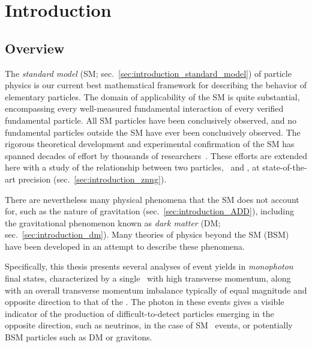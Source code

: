 \chapter{Introduction} \label{chap:introduction}
\section{Overview} \label{sec:introduction_overview}
The \textit{standard model} (SM; sec.~\ref{sec:introduction_standard_model}) of particle physics is our current best mathematical framework for describing the behavior
of elementary particles. The domain of applicability of the SM is quite substantial, encompassing
every well-measured fundamental interaction of every verified fundamental particle. All SM particles have been conclusively observed,
and no fundamental particles outside the SM have ever been conclusively observed. The rigorous theoretical development and experimental confirmation of the SM
has spanned decades of effort by thousands of researchers~\cite{ref:CahnGoldhaber, ref:PDG}.
These efforts are extended here with a study of the relationship between two particles, \PZ\ and \Pgamma, at state-of-the-art precision
(sec.~\ref{sec:introduction_znng}).

There are nevertheless many physical phenomena that the SM does not account for, such as the nature of gravitation (sec.~\ref{sec:introduction_ADD}),
including the gravitational phenomenon known as \textit{dark matter} (DM; sec.~\ref{sec:introduction_dm}). Many theories of physics beyond the SM (BSM)
have been developed in an attempt to describe these phenomena.

Specifically, this thesis presents several analyses of event yields in \textit{monophoton} final states, characterized by a single \Pgamma\ with
high transverse momentum, along with an overall transverse momentum imbalance typically of equal magnitude and opposite direction to
that of the \Pgamma. The photon in these events gives a visible indicator of the production of difficult-to-detect particles emerging in the opposite direction,
such as neutrinos, in the case of SM \zinvg\ events, or potentially BSM particles such as DM or gravitons.


